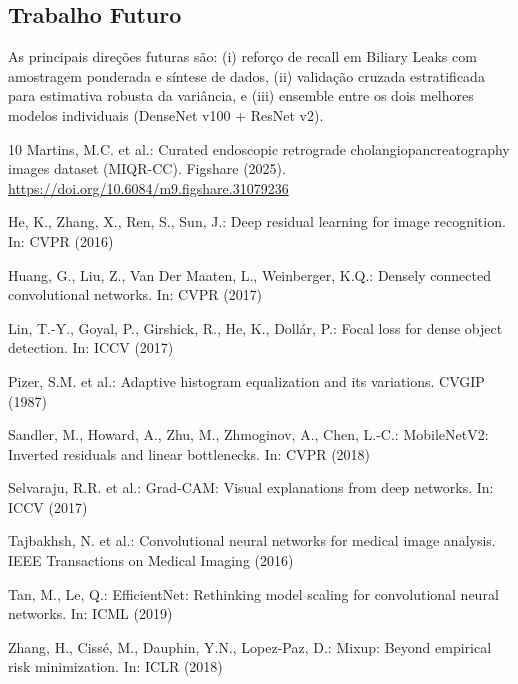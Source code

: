 \documentclass[runningheads]{llncs}
\begin{document}
\subsection{Trabalho Futuro}
As principais direções futuras são: (i) reforço de recall em Biliary Leaks com
amostragem ponderada e síntese de dados, (ii) validação cruzada estratificada
para estimativa robusta da variância, e (iii) ensemble entre os dois melhores
modelos individuais (DenseNet v100 + ResNet v2).

\begin{thebibliography}{10}
Martins, M.C. et al.: Curated endoscopic retrograde cholangiopancreatography
images dataset (MIQR-CC). Figshare (2025).
\url{https://doi.org/10.6084/m9.figshare.31079236}

He, K., Zhang, X., Ren, S., Sun, J.: Deep residual learning for image
recognition. In: CVPR (2016)

Huang, G., Liu, Z., Van Der Maaten, L., Weinberger, K.Q.: Densely connected
convolutional networks. In: CVPR (2017)

Lin, T.-Y., Goyal, P., Girshick, R., He, K., Dollár, P.: Focal loss for dense
object detection. In: ICCV (2017)

Pizer, S.M. et al.: Adaptive histogram equalization and its variations. CVGIP
(1987)

Sandler, M., Howard, A., Zhu, M., Zhmoginov, A., Chen, L.-C.: MobileNetV2:
Inverted residuals and linear bottlenecks. In: CVPR (2018)

Selvaraju, R.R. et al.: Grad-CAM: Visual explanations from deep networks. In:
ICCV (2017)

Tajbakhsh, N. et al.: Convolutional neural networks for medical image analysis.
IEEE Transactions on Medical Imaging (2016)

Tan, M., Le, Q.: EfficientNet: Rethinking model scaling for convolutional
neural networks. In: ICML (2019)

Zhang, H., Cissé, M., Dauphin, Y.N., Lopez-Paz, D.: Mixup: Beyond empirical
risk minimization. In: ICLR (2018)
\end{thebibliography}
\end{document}
